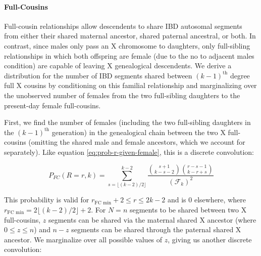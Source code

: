 \documentclass[9pt,twocolumn,twoside]{gsajnl}
\begin{document}
\paragraph{Full-Cousins}
\label{sec:full-cousins}

Full-cousin relationships allow descendents to share IBD autosomal segments
from either their shared maternal ancestor, shared paternal ancestral, or both.
In contrast, since males only pass an X chromosome to daughters, only
full-sibling relationships in which both offspring are female (due to the no to
adjacent males condition) are capable of leaving X genealogical descendents. We
derive a distribution for the number of IBD segments shared between
$(k-1)^\text{th}$ degree full X cousins by conditioning on this familial
relationship and marginalizing over the unobserved number of females from the
two full-sibling daughters to the present-day female full-cousins.

First, we find the number of females (including the two full-sibling daughters
in the $(k-1)^\text{th}$ generation) in the genealogical chain between the two
X full-cousins (omitting the shared male and female ancestors, which we account
for separately). Like equation \eqref{eq:prob-r-given-female}, this is a
discrete convolution:

\begin{equation}
  P_{FC}(R = r, k) = \sum_{s = \lfloor (k-2)/2 \rfloor}^{k-2} \frac{{s+1 \choose k-s-2 } {r-s-1 \choose k-r+s}}{(\mathcal{F}_k)^2}
\end{equation}

This probability is valid for $r_\text{FC min} + 2 \le r \le 2k-2$ and
is 0 elsewhere, where $r_\text{FC min} = 2\lfloor (k-2)/2\rfloor + 2$. For
$N=n$ segments to be shared between two X full-cousins, $z$ segments can be
shared via the maternal shared X ancestor (where $0 \le z \le n$) and $n-z$
segments can be shared through the paternal shared X ancestor. We marginalize
over all possible values of $z$, giving us another discrete convolution:
\end{document}
